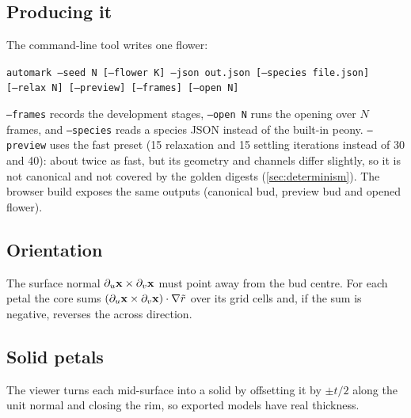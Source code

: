 \subsection{Producing it}
The command-line tool writes one flower:
\begin{center}\small
\texttt{automark --seed N [--flower K] --json out.json [--species file.json]}\\
\texttt{[--relax N] [--preview] [--frames] [--open N]}
\end{center}
\texttt{--frames} records the development stages, \texttt{--open N} runs the
opening over $N$ frames, and \texttt{--species} reads a species JSON instead of
the built-in peony. \texttt{--preview} uses the fast preset (15 relaxation and
15 settling iterations instead of 30 and 40): about twice as fast, but its
geometry and channels differ slightly, so it is not canonical and not covered
by the golden digests (\cref{sec:determinism}). The browser build exposes the
same outputs (canonical bud, preview bud and opened flower).

\subsection{Orientation}
The surface normal $\partial_u \mathbf{x} \times \partial_v \mathbf{x}$ must point away from the
bud centre. For each petal the core sums
$(\partial_u\mathbf{x}\times\partial_v\mathbf{x})\cdot\nabla\tilde r$ over its grid cells and, if the
sum is negative, reverses the across direction.

\subsection{Solid petals}
The viewer turns each mid-surface into a solid by offsetting it by $\pm t/2$
along the unit normal and closing the rim, so exported models have real
thickness.
